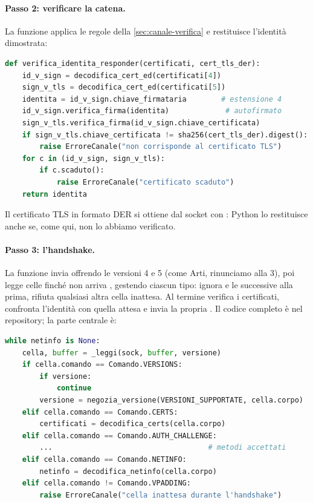 \paragraph{Passo 2: verificare la catena.} La funzione applica le regole della \cref{sec:canale-verifica} e restituisce l'identità dimostrata:

\begin{lstlisting}[language=Python]
def verifica_identita_responder(certificati, cert_tls_der):
    id_v_sign = decodifica_cert_ed(certificati[4])
    sign_v_tls = decodifica_cert_ed(certificati[5])
    identita = id_v_sign.chiave_firmataria        # estensione 4
    id_v_sign.verifica_firma(identita)             # autofirmato
    sign_v_tls.verifica_firma(id_v_sign.chiave_certificata)
    if sign_v_tls.chiave_certificata != sha256(cert_tls_der).digest():
        raise ErroreCanale("non corrisponde al certificato TLS")
    for c in (id_v_sign, sign_v_tls):
        if c.scaduto():
            raise ErroreCanale("certificato scaduto")
    return identita
\end{lstlisting}

Il certificato TLS in formato DER si ottiene dal socket con : Python lo restituisce anche se, come qui, non lo abbiamo verificato.

\paragraph{Passo 3: l'handshake.} La funzione  invia  offrendo le versioni 4 e 5 (come Arti, rinunciamo alla 3), poi legge celle finché non arriva , gestendo ciascun tipo: ignora  e le  successive alla prima, rifiuta qualsiasi altra cella inattesa. Al termine verifica i certificati, confronta l'identità con quella attesa e invia la propria . Il codice completo è nel repository; la parte centrale è:

\begin{lstlisting}[language=Python]
while netinfo is None:
    cella, buffer = _leggi(sock, buffer, versione)
    if cella.comando == Comando.VERSIONS:
        if versione:
            continue
        versione = negozia_versione(VERSIONI_SUPPORTATE, cella.corpo)
    elif cella.comando == Comando.CERTS:
        certificati = decodifica_certs(cella.corpo)
    elif cella.comando == Comando.AUTH_CHALLENGE:
        ...                                    # metodi accettati
    elif cella.comando == Comando.NETINFO:
        netinfo = decodifica_netinfo(cella.corpo)
    elif cella.comando != Comando.VPADDING:
        raise ErroreCanale("cella inattesa durante l'handshake")
\end{lstlisting}

